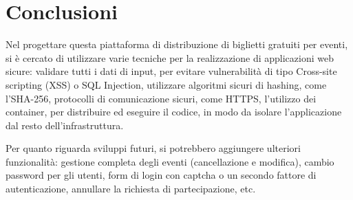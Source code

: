 \documentclass[italian,12pt,a4paper,oneside,final]{report}
\begin{document}
\section{Conclusioni}
Nel progettare questa piattaforma di distribuzione di biglietti gratuiti per eventi, si è cercato di utilizzare varie tecniche per la realizzazione di applicazioni web sicure: validare tutti i dati di input, per evitare vulnerabilità di tipo Cross-site scripting (XSS) o SQL Injection, utilizzare algoritmi sicuri di hashing, come l’SHA-256, protocolli di comunicazione sicuri, come HTTPS, l'utilizzo dei container, per distribuire ed eseguire il codice, in modo da isolare l'applicazione dal resto dell'infrastruttura.

Per quanto riguarda sviluppi futuri, si potrebbero aggiungere ulteriori funzionalità: gestione completa degli eventi (cancellazione e modifica), cambio password per gli utenti, form di login con captcha o un secondo fattore di autenticazione, annullare la richiesta di partecipazione, etc.
\end{document}
